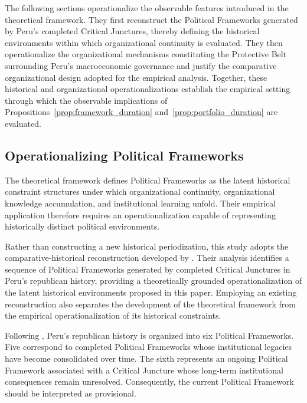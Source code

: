 \documentclass[doc, 12pt, a4paper,floatsintext]{apa7}
\begin{document}
The following sections operationalize the observable features introduced in the theoretical framework. They first reconstruct the Political Frameworks generated by Peru's completed Critical Junctures, thereby defining the historical environments within which organizational continuity is evaluated. They then operationalize the organizational mechanisms constituting the Protective Belt surrounding Peru's macroeconomic governance and justify the comparative organizational design adopted for the empirical analysis. Together, these historical and organizational operationalizations establish the empirical setting through which the observable implications of Propositions~\ref{prop:framework_duration} and~\ref{prop:portfolio_duration} are evaluated.

\subsection{Operationalizing Political Frameworks}

The theoretical framework defines Political Frameworks as the latent historical constraint structures under which organizational continuity, organizational knowledge accumulation, and institutional learning unfold. Their empirical application therefore requires an operationalization capable of representing historically distinct political environments.

Rather than constructing a new historical periodization, this study adopts the comparative-historical reconstruction developed by \textcite{lopez_jimenez_peru_2025}. Their analysis identifies a sequence of Political Frameworks generated by completed Critical Junctures in Peru's republican history, providing a theoretically grounded operationalization of the latent historical environments proposed in this paper. Employing an existing reconstruction also separates the development of the theoretical framework from the empirical operationalization of its historical constraints.

Following \textcite{lopez_jimenez_peru_2025}, Peru's republican history is organized into six Political Frameworks. Five correspond to completed Political Frameworks whose institutional legacies have become consolidated over time. The sixth represents an ongoing Political Framework associated with a Critical Juncture whose long-term institutional consequences remain unresolved. Consequently, the current Political Framework should be interpreted as provisional.
\end{document}
